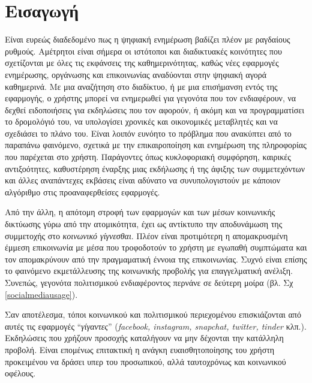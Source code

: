 \chapter{Εισαγωγή}
\label{chap1}

Είναι ευρεώς διαδεδομένο πως η ψηφιακή ενημέρωση βαδίζει πλέον με ραγδαίους ρυθμούς. Αμέτρητοι είναι σήμερα οι ιστότοποι και διαδικτυακές κοινότητες που σχετίζονται με όλες τις εκφάνσεις της καθημερινότητας, καθώς νέες εφαρμογές ενημέρωσης, οργάνωσης και επικοινωνίας αναδύονται στην ψηφιακή αγορά καθημερινά. Με μια αναζήτηση στο διαδίκτυο, ή με μια επισήμανση εντός της εφαρμογής, ο χρήστης μπορεί να ενημερωθεί για γεγονότα που τον ενδιαφέρουν, να δεχθεί ειδοποιήσεις για εκδηλώσεις που τον αφορούν, ή ακόμη και να προγραμματίσει το δρομολόγιό του, να υπολογίσει χρονικές και οικονομικές μεταβλητές και να σχεδιάσει το πλάνο του. Είναι λοιπόν ευνόητο το πρόβλημα που ανακύπτει από το παραπάνω φαινόμενο, σχετικά με την επικαιροποίηση και ενημέρωση της πληροφορίας που παρέχεται στο χρήστη. Παράγοντες όπως κυκλοφοριακή συμφόρηση, καιρικές αντιξοότητες, καθυστέρηση έναρξης μιας εκδήλωσης ή της άφιξης των συμμετεχόντων και άλλες αναπάντεχες εκβάσεις είναι αδύνατο να συνυπολογιστούν με κάποιον αλγόριθμο στις προαναφερθείσες εφαρμογές.

Από την άλλη, η απότομη στροφή των εφαρμογών και των μέσων κοινωνικής δικτύωσης γύρω από την ατομικότητα, έχει ως αντίκτυπο την αποδυνάμωση της συμμετοχής στο \textit{κοινωνικό γίγνεσθαι}. Πλέον είναι προτιμότερη η απομακρυσμένη έμμεση επικοινωνία με μέσα που τροφοδοτούν το χρήστη με εγωπαθή συμπτώματα και τον απομακρύνουν από την πραγμαματική έννοια της επικοινωνίας. Συχνό είναι επίσης το φαινόμενο εκμετάλλευσης της κοινωνικής προβολής για επαγγελματική ανέλιξη. Συνεπώς, γεγονότα  πολιτισμικού ενδιαφέροντος περνάνε σε δεύτερη μοίρα (βλ. Σχ \ref{socialmediausage}). 

Σαν αποτέλεσμα, τόποι κοινωνικού και πολιτισμικού περιεχομένου επισκιάζονται από αυτές τις εφαρμογές ``\textit{γίγαντες}'' (\textit{facebook, instagram, snapchat, twitter, tinder} κλπ.). Εκδηλώσεις που χρήζουν προσοχής καταλήγουν να μην δέχονται την κατάλληλη προβολή. Είναι επομένως επιτακτική η ανάγκη ευαισθητοποίησης του χρήστη προκειμένου να δράσει υπερ του προσωπικού, αλλά ταυτοχρόνως και κοινωνικού οφέλους.   

